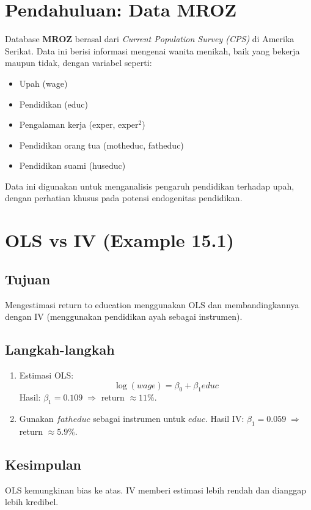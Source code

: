 \documentclass[]{article}
\begin{document}
\section*{Pendahuluan: Data MROZ}
Database \textbf{MROZ} berasal dari \textit{Current Population Survey (CPS)} di Amerika Serikat. Data ini berisi informasi mengenai wanita menikah, baik yang bekerja maupun tidak, dengan variabel seperti:
\begin{itemize}
    \item Upah (wage)
    \item Pendidikan (educ)
    \item Pengalaman kerja (exper, exper$^2$)
    \item Pendidikan orang tua (motheduc, fatheduc)
    \item Pendidikan suami (huseduc)
\end{itemize}
Data ini digunakan untuk menganalisis pengaruh pendidikan terhadap upah, dengan perhatian khusus pada potensi endogenitas pendidikan.

\section{OLS vs IV (Example 15.1)}
\subsection*{Tujuan}
Mengestimasi return to education menggunakan OLS dan membandingkannya dengan IV (menggunakan pendidikan ayah sebagai instrumen).

\subsection*{Langkah-langkah}
\begin{enumerate}
    \item Estimasi OLS:
    \[
    \log(wage) = \beta_0 + \beta_1 educ
    \]
    Hasil: $\beta_1 = 0.109 \; \Rightarrow$ return $\approx 11\%$.
    \item Gunakan $fatheduc$ sebagai instrumen untuk $educ$. 
    Hasil IV: $\beta_1 = 0.059 \; \Rightarrow$ return $\approx 5.9\%$.
\end{enumerate}

\subsection*{Kesimpulan}
OLS kemungkinan bias ke atas. IV memberi estimasi lebih rendah dan dianggap lebih kredibel.
\end{document}

